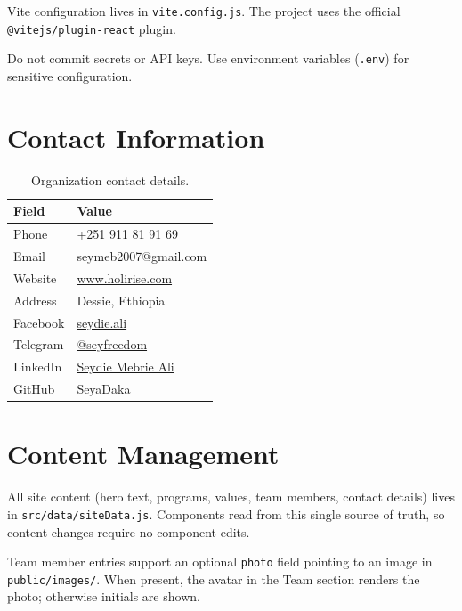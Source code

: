 \documentclass[11pt,a4paper]{article}
\begin{document}
Vite configuration lives in \texttt{vite.config.js}.  The project
uses the official \texttt{@vitejs/plugin-react} plugin.

\begin{warnbox}
Do not commit secrets or API keys.  Use environment variables
(\texttt{.env}) for sensitive configuration.
\end{warnbox}

\section{Contact Information}

\begin{table}[h]
\centering
\begin{tabular}{@{}ll@{}}
\toprule
\textbf{Field} & \textbf{Value} \\
\midrule
Phone     & +251 911 81 91 69 \\
Email     & seymeb2007@gmail.com \\
Website   & \href{https://www.holirise.com}{www.holirise.com} \\
Address   & Dessie, Ethiopia \\
Facebook  & \href{https://web.facebook.com/seydie.ali}{seydie.ali} \\
Telegram  & \href{https://t.me/seyfreedom}{@seyfreedom} \\
LinkedIn  & \href{https://www.linkedin.com/in/seydie-mebrie-ali-phd-4b020840/}{Seydie Mebrie Ali} \\
GitHub    & \href{https://github.com/SeyaDaka}{SeyaDaka} \\
\bottomrule
\end{tabular}
\caption{Organization contact details.}
\end{table}

\section{Content Management}

All site content (hero text, programs, values, team members, contact
details) lives in \texttt{src/data/siteData.js}.  Components read from
this single source of truth, so content changes require no component
edits.

Team member entries support an optional \texttt{photo} field pointing
to an image in \texttt{public/images/}.  When present, the avatar in the Team
section renders the photo; otherwise initials are shown.
\end{document}
